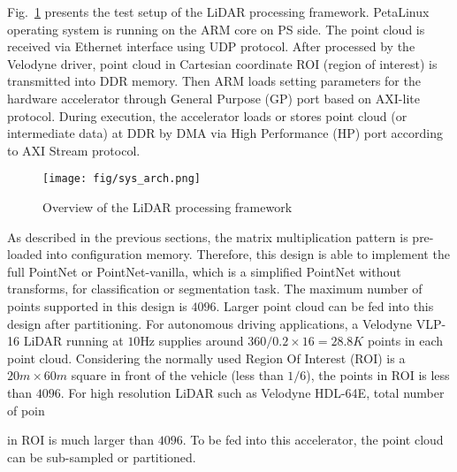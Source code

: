 \documentclass[conference]{IEEEtran}
\begin{document}
Fig.~\ref{fig:sys_arch} presents the test setup of the LiDAR processing framework. PetaLinux operating system is running on the ARM core on PS side. The point cloud is received via Ethernet interface using UDP protocol. After processed by the Velodyne driver, point cloud in Cartesian coordinate ROI (region of interest) is transmitted into DDR memory. Then ARM loads setting parameters for the hardware accelerator through General Purpose (GP) port based on AXI-lite protocol. During execution, the accelerator loads or stores point cloud (or intermediate data) at DDR by DMA via High Performance (HP) port according to AXI Stream protocol.

\begin{figure}[htbp]
    \centering
    \texttt{[image: fig/sys\_arch.png]}
    \caption{Overview of the LiDAR processing framework}
    \label{fig:sys_arch}
\end{figure}

As described in the previous sections, the matrix multiplication pattern is pre-loaded into configuration memory. Therefore, this design is able to implement the full PointNet or PointNet-vanilla, which is a simplified PointNet without transforms, for classification or segmentation task. The maximum number of points supported in this design is $4096$. Larger point cloud can be fed into this design after partitioning. For autonomous driving applications, a Velodyne VLP-16 LiDAR running at $10$Hz supplies around $360/0.2\times 16=28.8K$ points in each point cloud. Considering the normally used Region Of Interest (ROI) is a $20m\times 60m$ square in front of the vehicle (less than $1/6$), the points in ROI is less than $4096$. For high resolution LiDAR such as Velodyne HDL-64E, total number of poin
\begin{comment}
in each point cloud is $360/0.173\times 64=133.38K$. Even points
\end{comment}
in ROI is much larger than $4096$. To be fed into this accelerator, the point cloud can be sub-sampled or partitioned.
\end{document}
